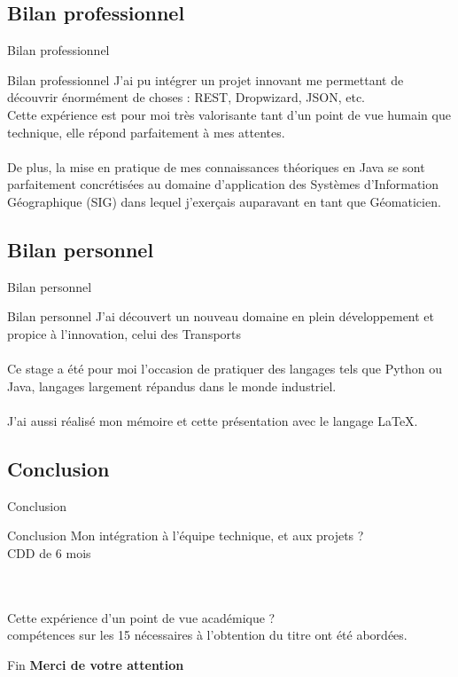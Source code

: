 \documentclass[utf8,compress]{beamer}
\begin{document}
\subsection{Bilan professionnel}
\begin{frame}{Bilan professionnel}
\begin{block}{Bilan professionnel}
J'ai pu intégrer un projet innovant me permettant de découvrir énormément de choses : REST, Dropwizard, JSON, etc.\\

Cette expérience est pour moi très valorisante tant d'un point de vue humain que technique, elle répond parfaitement à mes attentes.\\

~\\
De plus, la mise en pratique de mes connaissances théoriques en Java se sont parfaitement concrétisées au domaine d'application des Systèmes d'Information Géographique (SIG) dans lequel j'exerçais auparavant en tant que Géomaticien.
\end{block}
\end{frame}
\subsection{Bilan personnel}
\begin{frame}{Bilan personnel}
\begin{block}{Bilan personnel}
J'ai découvert un nouveau domaine en plein développement et propice à l'innovation, celui des \og Transports\fg \\
~\\

Ce stage a été pour moi l'occasion de pratiquer des langages tels que Python ou Java, langages largement répandus dans le monde industriel.\\
~\\

J'ai aussi réalisé mon mémoire et cette présentation avec le langage  \LaTeX{}.
\end{block}
\end{frame}


\subsection{Conclusion}
\begin{frame}{Conclusion}
\begin{block}{Conclusion}
Mon intégration à l'équipe technique, et aux projets ? 
~\\
\textrightarrow  	CDD de 6 mois

~\\
~\\

Cette expérience d'un point de vue académique ?
~\\
 compétences sur les 15 nécessaires à l'obtention du titre ont été abordées. 
\end{block}
\end{frame}

\begin{frame}{Fin}
\centering
\textbf{Merci de votre attention}

\end{frame}
\end{document}
